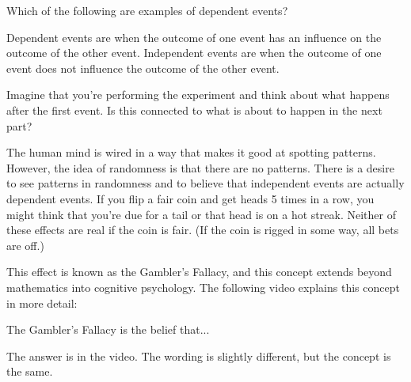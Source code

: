\documentclass{ximera}
\begin{document}
\begin{question}
Which of the following are examples of dependent events?
    \begin{hint}
    Dependent events are when the outcome of one event has an influence on the outcome of the other event. Independent events are when the outcome of one event does not influence the outcome of the other event.
    \end{hint}
    \begin{hint}
    Imagine that you're performing the experiment and think about what happens after the first event. Is this connected to what is about to happen in the next part?
    \end{hint}
    \begin{multipleChoice}
      \end{multipleChoice}

\end{question}

The human mind is wired in a way that makes it good at spotting patterns. However, the idea of randomness is that there are no patterns. There is a desire to see patterns in randomness and to believe that independent events are actually dependent events. If you flip a fair coin and get heads 5 times in a row, you might think that you're due for a tail or that head is on a hot streak. Neither of these effects are real if the coin is fair. (If the coin is rigged in some way, all bets are off.)

This effect is known as the Gambler's Fallacy, and this concept extends beyond mathematics into cognitive psychology. The following video explains this concept in more detail: 



\begin{question}
The Gambler's Fallacy is the belief that...

    \begin{multipleChoice}
      \end{multipleChoice}
    \begin{hint}
    The answer is in the video. The wording is slightly different, but the concept is the same.
    \end{hint}

\end{question}
\end{document}
